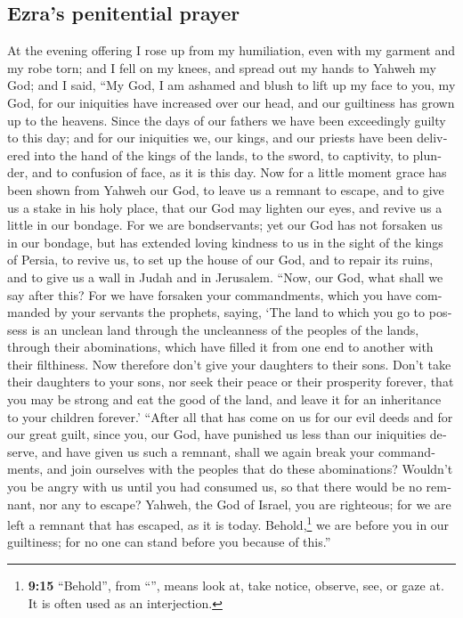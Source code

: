 \begin{paracol}{2}
\begin{otherlanguage}{english}
{\subsection{Ezra's penitential prayer}\label{ezras-penitential-prayer}}

 At the evening offering I rose up from my humiliation,
even with my garment and my robe torn; and I fell on my knees, and
spread out my hands to Yahweh my God;  and I said, ``My
God, I am ashamed and blush to lift up my face to you, my God, for our
iniquities have increased over our head, and our guiltiness has grown up
to the heavens.  Since the days of our fathers we have
been exceedingly guilty to this day; and for our iniquities we, our
kings, and our priests have been delivered into the hand of the kings of
the lands, to the sword, to captivity, to plunder, and to confusion of
face, as it is this day.  Now for a little moment grace
has been shown from Yahweh our God, to leave us a remnant to escape, and
to give us a stake in his holy place, that our God may lighten our eyes,
and revive us a little in our bondage.  For we are
bondservants; yet our God has not forsaken us in our bondage, but has
extended loving kindness to us in the sight of the kings of Persia, to
revive us, to set up the house of our God, and to repair its ruins, and
to give us a wall in Judah and in Jerusalem.  ``Now, our
God, what shall we say after this? For we have forsaken your
commandments,  which you have commanded by your servants
the prophets, saying, `The land to which you go to possess is an unclean
land through the uncleanness of the peoples of the lands, through their
abominations, which have filled it from one end to another with their
filthiness.  Now therefore don't give your daughters to
their sons. Don't take their daughters to your sons, nor seek their
peace or their prosperity forever, that you may be strong and eat the
good of the land, and leave it for an inheritance to your children
forever.'  ``After all that has come on us for our evil
deeds and for our great guilt, since you, our God, have punished us less
than our iniquities deserve, and have given us such a remnant,
 shall we again break your commandments, and join
ourselves with the peoples that do these abominations? Wouldn't you be
angry with us until you had consumed us, so that there would be no
remnant, nor any to escape?  Yahweh, the God of Israel,
you are righteous; for we are left a remnant that has escaped, as it is
today. Behold,\footnote{\textbf{9:15} ``Behold'', from ``'',
  means look at, take notice, observe, see, or gaze at. It is often used
  as an interjection.} we are before you in our guiltiness; for no one
can stand before you because of this.''


\end{otherlanguage}
\end{paracol}
